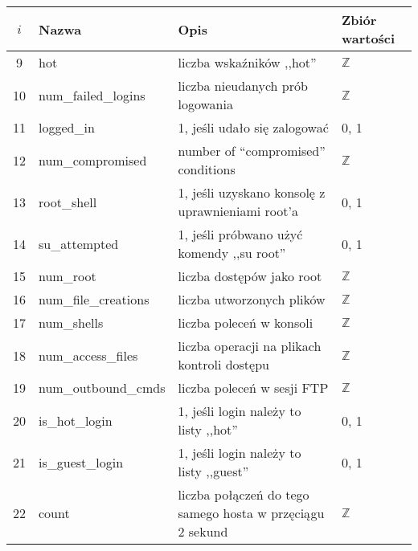 \documentclass[a4paper, 12pt]{article}
\begin{document}
\begin{tabular}{ | c | l | p{} | p{} | } \hline
$i$ & Nazwa & Opis & Zbiór wartości \\ \hline
9      & hot & liczba wskaźników ,,hot'' & $\mathbb{Z}$ \\ \hline
10      & num\_failed\_logins  & liczba nieudanych prób logowania & $\mathbb{Z}$ \\ \hline
11      & logged\_in  & 1, jeśli udało się zalogować &  0, 1 \\ \hline
12      & num\_compromised & number of ``compromised'' conditions   &  $\mathbb{Z}$ \\ \hline
13      & root\_shell  & 1, jeśli uzyskano konsolę z uprawnieniami root'a  &  0, 1 \\ \hline
14      & su\_attempted  & 1, jeśli próbwano użyć komendy ,,su root'' &  0, 1 \\ \hline
15      & num\_root  & liczba dostępów jako root  & $\mathbb{Z}$ \\ \hline
16      & num\_file\_creations  & liczba utworzonych plików  & $\mathbb{Z}$ \\ \hline
17      & num\_shells  & liczba poleceń w konsoli & $\mathbb{Z}$ \\ \hline
18      & num\_access\_files  & liczba operacji na plikach kontroli dostępu & $\mathbb{Z}$ \\ \hline
19      & num\_outbound\_cmds & liczba poleceń w sesji FTP & $\mathbb{Z}$ \\ \hline
20      & is\_hot\_login  & 1, jeśli login należy to listy ,,hot'' &  0, 1 \\ \hline
21      & is\_guest\_login  & 1, jeśli login należy to listy ,,guest'' &  0, 1 \\ \hline
22     & count & liczba połączeń do tego samego hosta w przęciągu 2 sekund & $\mathbb{Z}$ \\ \hline
\end{tabular}
\end{document}
